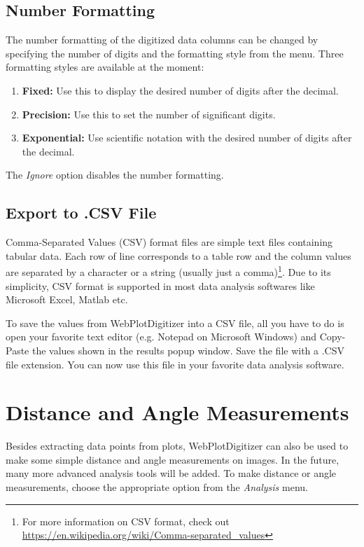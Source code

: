 \documentclass[letterpaper, 11pt]{article}
\begin{document}
\subsection{Number Formatting}
The number formatting of the digitized data columns can be changed by specifying the number of digits and the formatting style from the menu. Three formatting styles are available at the moment: 
\begin{enumerate}
\item{{\bf Fixed:} Use this to display the desired number of digits after the decimal.}
\item{{\bf Precision:} Use this to set the number of significant digits.}
\item{{\bf Exponential: } Use scientific notation with the desired number of digits after the decimal.}
\end{enumerate}
The \emph{Ignore} option disables the number formatting.

\subsection{Export to .CSV File}
Comma-Separated Values (CSV) format files are simple text files containing tabular data. Each row of line corresponds to a table row and the column values are separated by a character or a string (usually just a comma)\footnote{For more information on CSV format, check out \url{https://en.wikipedia.org/wiki/Comma-separated_values}}. Due to its simplicity, CSV format is supported in most data analysis softwares like Microsoft Excel, Matlab etc.

To save the values from WebPlotDigitizer into a CSV file, all you have to do is open your favorite text editor (e.g. Notepad on Microsoft Windows) and Copy-Paste the values shown in the results popup window. Save the file with a .CSV file extension. You can now use this file in your favorite data analysis software.


\section{Distance and Angle Measurements}
Besides extracting data points from plots, WebPlotDigitizer can also be used to make some simple distance and angle measurements on images. In the future, many more advanced analysis tools will be added. To make distance or angle measurements, choose the appropriate option from the \emph{Analysis} menu.
\end{document}

